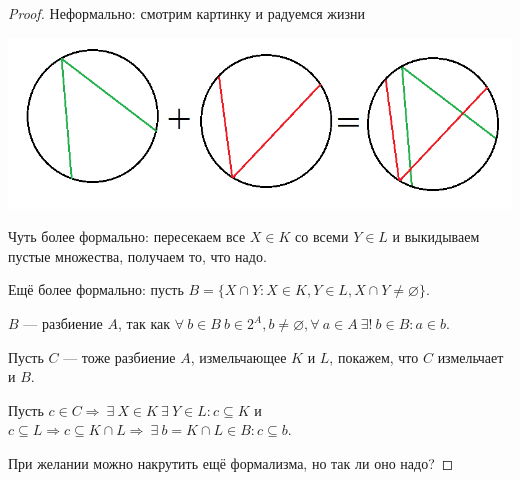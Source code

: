 \begin{proof}
    Неформально: смотрим картинку и радуемся жизни

    \includegraphics[scale=0.5]{res/произведение разбиений}

    Чуть более формально: пересекаем все $X \in K$ со всеми $Y \in L$ и выкидываем пустые множества, получаем то, что надо.

    Ещё более формально: пусть $B = \{X\cap Y : X\in K, Y\in L, X\cap Y \neq \varnothing\}$.

    $B$ — разбиение $A$, так как $\forall ~b \in B ~b \in 2^A, b \neq \varnothing, \forall ~a \in A ~\exists! ~b\in B: a\in b$.

    Пусть $C$ --- тоже разбиение $A$, измельчающее $K$ и $L$, покажем, что $C$ измельчает и $B$.

    Пусть $c \in C \Rightarrow ~\exists ~X \in K ~\exists ~Y \in L: c\subseteq K$ и $c \subseteq L \Rightarrow c \subseteq K \cap L \Rightarrow ~\exists ~b=K\cap L \in B: c\subseteq b$.

    При желании можно накрутить ещё формализма, но так ли оно надо?
\end{proof}
